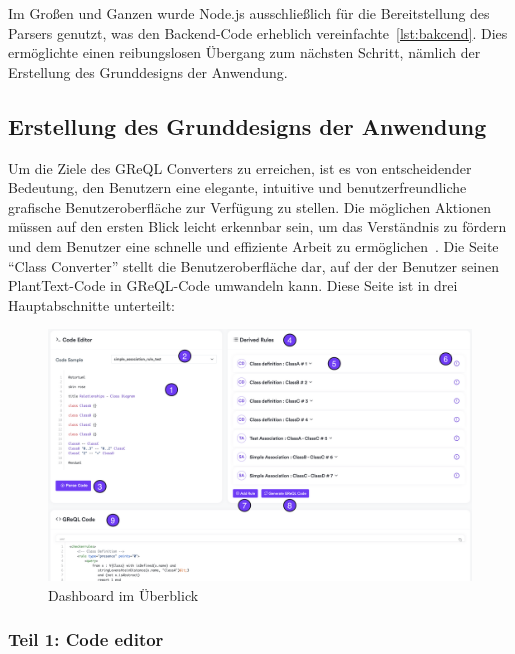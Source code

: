 Im Großen und Ganzen wurde Node.js ausschließlich für die Bereitstellung des Parsers genutzt, was den Backend-Code
erheblich vereinfachte~\ref{lst:bakcend}. Dies ermöglichte einen reibungslosen Übergang zum nächsten Schritt, nämlich
der Erstellung des Grunddesigns der Anwendung.

\subsection{Erstellung des Grunddesigns der Anwendung}\label{subsec:erstellung-des-grunddesigns-der-anwendung}

Um die Ziele des \gls{GReQL Converter}s zu erreichen, ist es von entscheidender Bedeutung, den Benutzern eine elegante,
intuitive und benutzerfreundliche grafische Benutzeroberfläche zur Verfügung zu stellen. Die möglichen Aktionen müssen
auf den ersten Blick leicht erkennbar sein, um das Verständnis zu fördern und dem Benutzer eine schnelle und effiziente
Arbeit zu ermöglichen~\cite{guntupalli2008user}. Die Seite ``Class Converter'' stellt die Benutzeroberfläche dar, auf
der der Benutzer seinen PlantText-Code in GReQL-Code umwandeln kann. Diese Seite ist in drei Hauptabschnitte unterteilt:

\begin{figure}
    \centering
    \includegraphics[width=16cm]{images/board}
    \caption{Dashboard im Überblick}
    \label{fig:dashboard}
\end{figure}

\subsubsection{Teil 1: Code editor}

